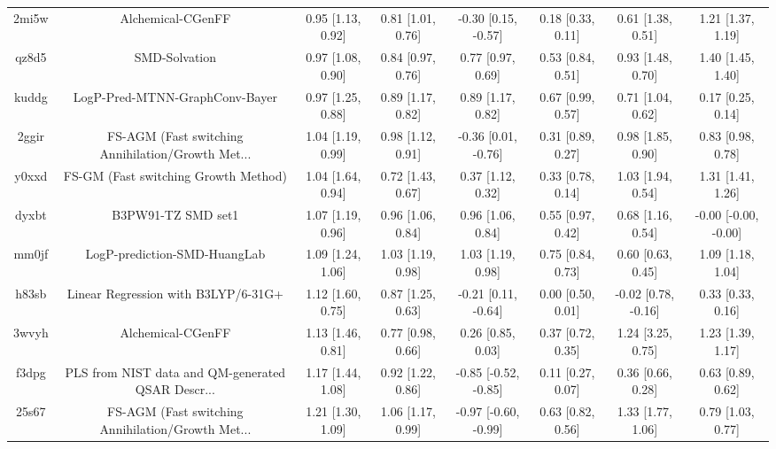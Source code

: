 \documentclass{article}
\begin{document}
\begin{center}
\begin{longtable}{|cccccccc|}
 2mi5w &                                  Alchemical-CGenFF &  0.95 [1.13, 0.92] &  0.81 [1.01, 0.76] &   -0.30 [0.15, -0.57] &  0.18 [0.33, 0.11] &     0.61 [1.38, 0.51] &     1.21 [1.37, 1.19] \\
 qz8d5 &                                      SMD-Solvation &  0.97 [1.08, 0.90] &  0.84 [0.97, 0.76] &     0.77 [0.97, 0.69] &  0.53 [0.84, 0.51] &     0.93 [1.48, 0.70] &     1.40 [1.45, 1.40] \\
 kuddg &                     LogP-Pred-MTNN-GraphConv-Bayer &  0.97 [1.25, 0.88] &  0.89 [1.17, 0.82] &     0.89 [1.17, 0.82] &  0.67 [0.99, 0.57] &     0.71 [1.04, 0.62] &     0.17 [0.25, 0.14] \\
 2ggir &  FS-AGM (Fast switching Annihilation/Growth Met... &  1.04 [1.19, 0.99] &  0.98 [1.12, 0.91] &   -0.36 [0.01, -0.76] &  0.31 [0.89, 0.27] &     0.98 [1.85, 0.90] &     0.83 [0.98, 0.78] \\
 y0xxd &               FS-GM (Fast switching Growth Method) &  1.04 [1.64, 0.94] &  0.72 [1.43, 0.67] &     0.37 [1.12, 0.32] &  0.33 [0.78, 0.14] &     1.03 [1.94, 0.54] &     1.31 [1.41, 1.26] \\
 dyxbt &                                 B3PW91-TZ SMD set1 &  1.07 [1.19, 0.96] &  0.96 [1.06, 0.84] &     0.96 [1.06, 0.84] &  0.55 [0.97, 0.42] &     0.68 [1.16, 0.54] &  -0.00 [-0.00, -0.00] \\
 mm0jf &                       LogP-prediction-SMD-HuangLab &  1.09 [1.24, 1.06] &  1.03 [1.19, 0.98] &     1.03 [1.19, 0.98] &  0.75 [0.84, 0.73] &     0.60 [0.63, 0.45] &     1.09 [1.18, 1.04] \\
 h83sb &                Linear Regression with B3LYP/6-31G+ &  1.12 [1.60, 0.75] &  0.87 [1.25, 0.63] &   -0.21 [0.11, -0.64] &  0.00 [0.50, 0.01] &   -0.02 [0.78, -0.16] &     0.33 [0.33, 0.16] \\
 3wvyh &                                  Alchemical-CGenFF &  1.13 [1.46, 0.81] &  0.77 [0.98, 0.66] &     0.26 [0.85, 0.03] &  0.37 [0.72, 0.35] &     1.24 [3.25, 0.75] &     1.23 [1.39, 1.17] \\
 f3dpg &  PLS from NIST data and QM-generated QSAR Descr... &  1.17 [1.44, 1.08] &  0.92 [1.22, 0.86] &  -0.85 [-0.52, -0.85] &  0.11 [0.27, 0.07] &     0.36 [0.66, 0.28] &     0.63 [0.89, 0.62] \\
 25s67 &  FS-AGM (Fast switching Annihilation/Growth Met... &  1.21 [1.30, 1.09] &  1.06 [1.17, 0.99] &  -0.97 [-0.60, -0.99] &  0.63 [0.82, 0.56] &     1.33 [1.77, 1.06] &     0.79 [1.03, 0.77] \\

\end{longtable}
\end{center}
\end{document}
